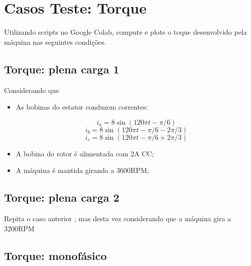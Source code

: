 \documentclass[a4paper]{article}
\theoremstyle{definition}
\theoremstyle{plain}
\begin{document}
\section{Casos Teste: Torque}

Utilizando scripts no Google Colab, compute e plote o toque desenvolvido pela máquina nas seguintes condições.



\subsection{Torque: plena carga 1}

Considerando que

\begin{itemize}
\item As bobinas do estator conduzem correntes:
	
	\begin{equation}
		i_a = 8 \sin(120\pi t - \pi/6)
	\end{equation}
	\begin{equation}
		i_b = 8 \sin(120\pi t - \pi/6 - 2\pi/3)
	\end{equation}
	\begin{equation}
		i_c = 8 \sin(120\pi t - \pi/6 + 2\pi/3)
	\end{equation}

\item A bobina do rotor é alimentada com 2A CC;
\item A máquina é mantida girando a 3600RPM;
\end{itemize}



\subsection{Torque: plena carga 2}

Repita o caso anterior , mas desta vez considerando que a máquina gira a 3200RPM



\subsection{Torque: monofásico}
\end{document}
